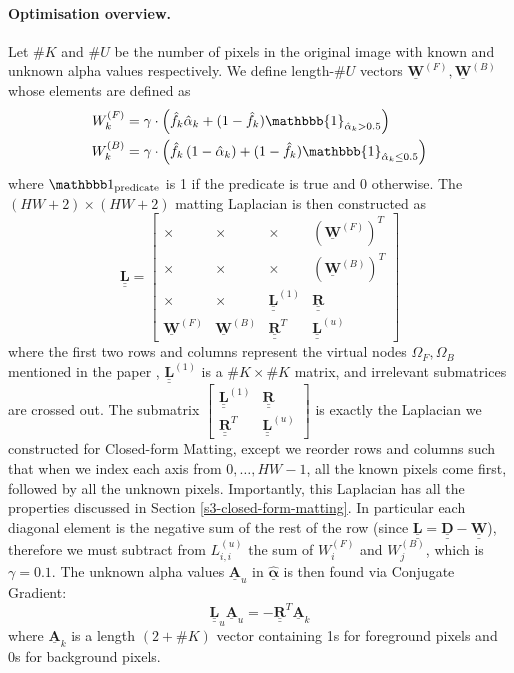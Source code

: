 \documentclass{article}
\theoremstyle{definition}
\def\vt#1{\underline{\mathbf{#1}}}
\def\vts#1{\underline{\boldsymbol{#1}}}
\def\mt#1{\underline{\underline{\mathbf{#1}}}}
\begin{document}
\begin{multicols}{2}[]
\paragraph{Optimisation overview.} Let $\#K$ and $\#U$ be the number of pixels in the original image with known and unknown alpha values respectively. We define length-$\#U$ vectors $\vt W^{(F)}, \vt W^{(B)}$ whose elements are defined as
\begin{align*}
    W^{(F)}_k &= \gamma\cdot\left(\hat f_k \hat{\alpha}_k + (1-\hat f_k) \mathbbb{1}_{\hat{\alpha}_k > 0.5} \right)\\
    W^{(B)}_k &= \gamma\cdot\left(\hat f_k \left(1-\hat{\alpha}_k\right) + (1-\hat f_k) \mathbbb{1}_{\hat{\alpha}_k \leq 0.5} \right)
\end{align*}
where $\mathbbb1_\text{predicate}$ is 1 if the predicate is true and 0 otherwise. The $(HW+2)\times(HW+2)$ matting Laplacian is then constructed as
$$\mt L = \left[\begin{smallmatrix}
    \times & \times & \times & \left(\vt W^{(F)}\right)^T \\
    \times & \times & \times & \left(\vt W^{(B)}\right)^T \\
    \times & \times & \mt L^{(1)} & \mt R \\
    \vt W^{(F)} & \vt W^{(B)} & \mt R^T & \mt L^{(u)}
\end{smallmatrix}\right]$$
where the first two rows and columns represent the virtual nodes $\Omega_F,\Omega_B$ mentioned in the paper \cite[\S4.3]{robust-matting}, $\mt L^{(1)}$ is a $\#K \times \#K$ matrix, and irrelevant submatrices are crossed out. The submatrix $\left[\begin{smallmatrix}\mt L^{(1)} & \mt R \\ \mt R^T & \mt L^{(u)}\end{smallmatrix}\right]$ is exactly the Laplacian we constructed for Closed-form Matting, except we reorder rows and columns such that when we index each axis from $0,\dots,HW-1$, all the known pixels come first, followed by all the unknown pixels. Importantly, this Laplacian has all the properties discussed in Section \ref{s3-closed-form-matting}. In particular each diagonal element is the negative sum of the rest of the row (since $\mt L = \mt D - \mt W$), therefore we must subtract from $L^{(u)}_{i,i}$ the sum of $W^{(F)}_i$ and $W^{(B)}_j$, which is $\gamma=0.1$. The unknown alpha values $\vt A_u$ in $\hat{\vts \alpha}$ is then found via Conjugate Gradient:
$$\mt L_u \vt A_u = -\mt R^T \vt A_k$$
where $\vt A_k$ is a length $(2+\# K)$ vector containing 1s for foreground pixels and 0s for background pixels.


\end{multicols}
\end{document}
